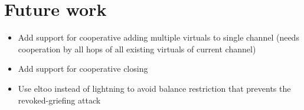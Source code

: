 \section{Future work}
  \begin{itemize}
    \item Add support for cooperative adding multiple virtuals to single channel
    (needs cooperation by all hops of all existing virtuals of current channel)
    \item Add support for cooperative closing
    \item Use eltoo instead of lightning to avoid balance restriction that
    prevents the revoked-griefing attack
  \end{itemize}
